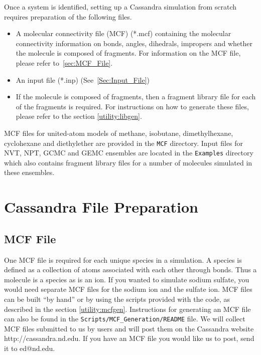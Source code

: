 Once a system is identified, setting up a Cassandra simulation from
scratch requires preparation of the following files. \\

\begin{itemize}
\item A molecular connectivity file (MCF)  (*.mcf) containing the molecular
  connectivity information on bonds, angles, dihedrals, impropers and
  whether the molecule is composed of fragments. For information on
  the MCF file, please refer to~\autoref{sec:MCF_File}.

\item An input file (*.inp) (See~\autoref{Sec:Input_File})

\item If the molecule is composed of fragments, then a fragment library file for each of the fragments is required. For instructions on how to generate these files, please refer to the
section \ref{utility:libgen}.

\end{itemize}
%
MCF files for united-atom models of methane, isobutane, dimethylhexane, cyclohexane and diethylether are provided in the \texttt{MCF} directory. Input files for NVT, NPT, GCMC and GEMC ensembles are located in the \texttt{Examples} directory which also contains fragment library files for a number of molecules simulated in these ensembles. 


\section{Cassandra File Preparation}

\subsection{MCF File}
One MCF file is required for each unique species in a simulation. A
species is defined as a collection of atoms associated with each other
through bonds. Thus a molecule is a species as is an ion. If you
wanted to simulate sodium sulfate, you would need separate MCF files
for the sodium ion and the sulfate ion. MCF files can be built ``by
hand'' or by using the scripts provided with the code, as described in
the section \ref{utility:mcfgen}. Instructions for generating an MCF file can also be found in the \texttt{Scripts/MCF\_Generation/README} file. 
We will collect MCF files submitted to us by users and will post them on the Cassandra
website http://cassandra.nd.edu. If you have an MCF file you would
like us to post, send it to ed@nd.edu.
%
%
